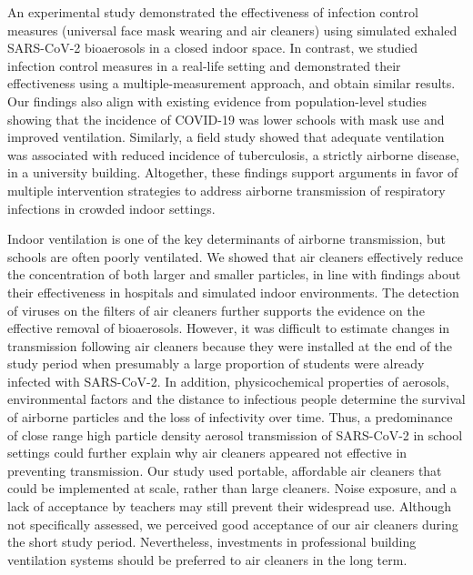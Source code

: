 \documentclass[fleqn,11pt]{wlscirep}
\begin{document}
{An experimental study demonstrated the effectiveness of infection control measures (universal face mask wearing and air cleaners) using simulated exhaled SARS-CoV-2 bioaerosols in a closed indoor space\cite{Lindsley2021}. In contrast, we studied infection control measures in a real-life setting and demonstrated their effectiveness using a multiple-measurement approach, and obtain similar results. Our findings also align with existing evidence from population-level studies showing that the incidence of COVID-19 was lower schools with mask use\cite{Heinsohn2022,Gettings2021} and improved ventilation\cite{Gettings2021}. Similarly, a field study showed that adequate ventilation was associated with reduced incidence of tuberculosis, a strictly airborne disease, in a university building\cite{Du2020}. Altogether, these findings support arguments in favor of multiple intervention strategies to address airborne transmission of respiratory infections in crowded indoor settings\cite{Morawska2021}. 

Indoor ventilation is one of the key determinants of airborne transmission\cite{Fennelly2020,Wang2021}, but schools are often poorly ventilated\cite{Santamouris2008,DiGilio2021}. We showed that air cleaners effectively reduce the concentration of both larger and smaller particles, in line with findings about their effectiveness in hospitals\cite{Morris2022} and simulated indoor environments\cite{Lindsley2021}. The detection of viruses on the filters of air cleaners further supports the evidence on the effective removal of bioaerosols. However, it was difficult to estimate changes in transmission following air cleaners because they were installed at the end of the study period when presumably a large proportion of students were already infected with SARS-CoV-2. In addition, physicochemical properties of aerosols, environmental factors and the distance to infectious people determine the survival of airborne particles and the loss of infectivity over time\cite{Wang2021}. Thus, a predominance of close range high particle density aerosol transmission of SARS-CoV-2 in school settings could further explain why air cleaners appeared not effective in preventing transmission. Our study used portable, affordable air cleaners that could be implemented at scale, rather than large cleaners\cite{Duill2021}. Noise exposure, and a lack of acceptance by teachers\cite{Sanguinetti2022} may still prevent their widespread use. Although not specifically assessed, we perceived good acceptance of our air cleaners during the short study period. Nevertheless, investments in professional building ventilation systems should be preferred to air cleaners in the long term\cite{Nardell2016}.  

}
\end{document}
